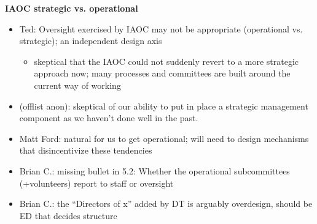 \documentclass[helvetica]{seminar}
\newcommand{\heading}[1]{%
  \begin{center} 
    \large\bf 
    #1 
  \end{center} 
  \vspace{.4 in}}
\begin{document}
\begin{slide}

\heading{IAOC strategic vs. operational}

\vspace{-8ex}         %
\begin{itemize}
\item Ted: Oversight exercised by IAOC may not be appropriate
  (operational vs. strategic); an independent design axis
  \begin{itemize}
  \item skeptical that the IAOC could not suddenly revert to a more
    strategic approach now; many processes and committees are built
    around the current way of working
  \end{itemize}
\item (offlist anon): skeptical of our ability to put in place a
  strategic management component as we haven’t done well in the past.
\item Matt Ford: natural for us to get operational; will need to
  design mechanisms that disincentivize these tendencies
\item Brian C.: missing bullet in 5.2: Whether the operational
  subcommittees (+volunteers) report to staff or oversight
\item Brian C.: the ``Directors of x'' added by DT is arguably
  overdesign, should be ED that decides structure
\end{itemize}

\end{slide}
\end{document}
